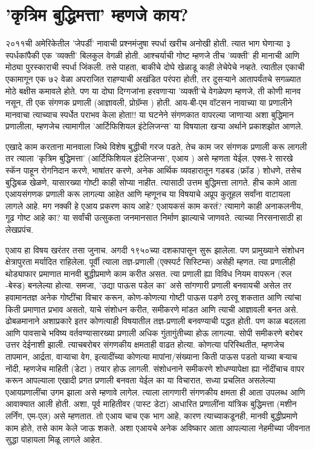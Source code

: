 \chapter{'कृत्रिम बुद्धिमत्ता' म्हणजे काय?}

२०११ची अमेरिकेतील 'जेपर्डी' नावाची प्रश्नमंजुषा स्पर्धा खरीच अनोखी होती. त्यात भाग घेणाऱ्या ३ स्पर्धकांपैकी एक 'व्यक्ती' बिलकुल वेगळी होती. आश्चर्याची गोष्ट म्हणजे तीच 'व्यक्ती' ही मानाची आणि मोठ्या पुरस्काराची स्पर्धा जिंकली. तसे पाहता, बाकीचे दोघे खेळाडू काही लेचेपेचे नव्हते. त्यातील एकाची एकामागून एक ७२ वेळा अपराजित राहण्याची अखंडित परंपरा होती, तर दुसऱ्याने आतापर्यंतचे सगळ्यात मोठे बक्षीस कमावले होते. पण या दोघा दिग्गजांना हरवणाऱ्या 'व्यक्ती'चे वेगळेपण म्हणजे, ती कोणी मानव नसून, ती एक संगणक प्रणाली (आज्ञावली, प्रोग्रॅम्स ) होती. आय-बी-एम वॉटसन   नावाच्या या प्रणालीने मानवाचा त्याच्याच स्पर्धेत पराभव केला होता!! या घटनेने संगणकात वापरल्या जाणाऱ्या अशा बुद्धिमान प्रणालीला, म्हणजेच त्यामागील 'आर्टिफिशियल इंटेलिजन्स' या विषयाला खऱ्या अर्थाने प्रकाशझोत आणले.

एखादे काम करताना मानवाला जिथे विशेष बुद्धीची गरज पडते, तेच काम जर संगणक प्रणाली करू लागली तर त्याला 'कृत्रिम बुद्धिमत्ता' (आर्टिफिशियल इंटेलिजन्स', एआय ) असे म्हणता येईल. एक्स-रे सारखे स्कॅन पाहून रोगनिदान करणे, भाषांतर करणे, अनेक आर्थिक व्यवहारातून गडबड (फ्रॉड ) शोधणे, तसेच बुद्धिबळ खेळणे, यासारख्या गोष्टी काही सोप्या नाहीत. त्यासाठी उत्तम बुद्धिमत्ता लागते. हीच कामे आता एआयसंगणक प्रणाली करू लागल्या आहेत आणि म्हणूनच या विषयाचे अप्रूप कुतूहल सर्वांना वाटायला लागले आहे. मग नक्की हे एआय प्रकरण काय आहे? एआयकसं काम करतं? त्यामागे काही अनाकलनीय, गूढ गोष्ट आहे का? या सर्वांची उत्सुकता जनमानसात निर्माण झाल्याचे जाणवते. त्याच्या निरसनासाठी हा लेखप्रपंच.

एआय हा विषय खरंतर तसा जुनाच. अगदी १९५०च्या दशकापासून सुरू झालेला. पण प्रामुख्याने संशोधन क्षेत्रापुरता मर्यादित राहिलेला. पूर्वी त्याला तज्ञ-प्रणाली (एक्स्पर्ट सिस्टिम्स) असेही म्हणत. त्या प्रणालीही थोड्याफार प्रमाणात मानवी बुद्धीप्रमाणे काम करीत असत. त्या प्रणाली ह्या विविध नियम वापरून (रुल -बेस्ड) बनलेल्या होत्या. समजा, 'उद्या पाऊस पडेल का' असे सांगणारी प्रणाली बनवायची असेल तर हवामानतज्ञ अनेक गोष्टींचा विचार करून, कोण-कोणत्या गोष्टी पाऊस पडणे ठरवू शकतात आणि त्यांचा किती प्रमाणात प्रभाव असतो, याचे संशोधन करीत, समीकरणे मांडत आणि त्याची आज्ञावली बनत असे. ढोबळमानाने अशाप्रकारे इतर कोणत्याही विषयातील तज्ञ-प्रणाली बनवण्याची पद्धत होती. पण काळ बदलला आणि पावसाचे भविष्य वर्तवण्यासारख्या प्रणाली अधिक गुंतागुंतीच्या होऊ लागल्या. सोपी समीकरणे बरोबर उत्तर देईनाशी झाली. त्याचबरोबर संगणकीय क्षमताही वाढत होत्या. कोणत्या परिस्थितीत, म्हणजेच तापमान, आर्द्रता, वाऱ्याचा वेग, इत्यादींच्या कोणत्या मापांना/संख्याना किती पाऊस पडतो याच्या बऱ्याच नोंदी, म्हणजेच माहिती (डेटा ) तयार होऊ लागली. संशोधनाने समीकरणे शोधण्यापेक्षा ह्या नोंदींचाच वापर करून आपल्याला एखादी प्रगत प्रणाली बनवता येईल का या विचारात, सध्या प्रचलित असलेल्या एआयप्रणालींचा उगम झाला असे म्हणावे लागेल. त्याला लागणारी संगणकीय क्षमता ही आता उपलब्ध आणि आवाक्यात आली होती. अशा, पूर्व माहितीवर (पास्ट डेटा) आधारित प्रणालींना यांत्रिक बुद्धिमत्ता (मशीन लर्निंग, एम-एल) असे म्हणतात. तो एआय चाच एक भाग आहे, कारण त्याच्याकडूनही, मानवी बुद्धीप्रमाणे काम होते, तसे काम केले जाऊ शकते. अशा एआयचे अनेक अविष्कार आता आपल्याला नेहमीच्या जीवनात सुद्धा पाहायला मिळू लागले आहेत.

